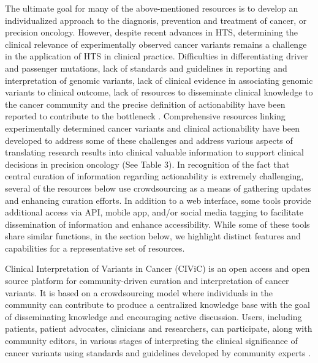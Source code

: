 \documentclass{article}
\begin{document}
The ultimate goal for many of the above-mentioned resources is to
develop an individualized approach to the diagnosis, prevention and
treatment of cancer, or precision oncology. However, despite recent
advances in HTS, determining the clinical relevance of experimentally
observed cancer variants remains a challenge in the application of HTS
in clinical practice. Difficulties in differentiating driver and
passenger mutations, lack of standards and guidelines in reporting and
interpretation of genomic variants, lack of clinical evidence in
associating genomic variants to clinical outcome, lack of resources to
disseminate clinical knowledge to the cancer community and the precise
definition of actionability have been reported to contribute to the
bottleneck
\cite{Li2017-aw,Prawira2017-gv,Uzilov2016-ct,Hedley_Carr2016-ul}. Comprehensive
resources linking experimentally determined cancer variants and
clinical actionability have been developed to address some of these
challenges and address various aspects of translating research results
into clinical valuable information to support clinical decisions in
precision oncology (See Table 3). In recognition of the fact that
central curation of information regarding actionability is extremely
challenging, several of the resources below use crowdsourcing as a
means of gathering updates and enhancing curation efforts. In addition
to a web interface, some tools provide additional access via API,
mobile app, and/or social media tagging to facilitate dissemination of
information and enhance accessibility. While some of these tools share
similar functions, in the section below, we highlight distinct
features and capabilities for a representative set of resources.

Clinical Interpretation of Variants in Cancer (CIViC) is an open
access and open source platform for community-driven curation and
interpretation of cancer variants. It is based on a crowdsourcing
model where individuals in the community can contribute to produce a
centralized knowledge base with the goal of disseminating knowledge
and encouraging active discussion. Users, including patients, patient
advocates, clinicians and researchers, can participate, along with
community editors, in various stages of interpreting the clinical
significance of cancer variants using standards and guidelines
developed by community experts \cite{Li2017-aw,Griffith2016-sy}.
\end{document}
